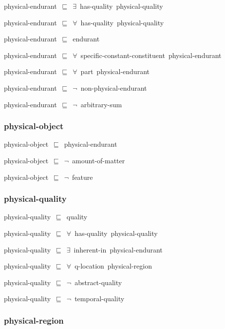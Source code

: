 \documentclass{article}
\begin{document}
physical-endurant~\ensuremath{\sqsubseteq}~\ensuremath{\exists}~has-quality~physical-quality~

physical-endurant~\ensuremath{\sqsubseteq}~\ensuremath{\forall}~has-quality~physical-quality~

physical-endurant~\ensuremath{\sqsubseteq}~endurant~

physical-endurant~\ensuremath{\sqsubseteq}~\ensuremath{\forall}~specific-constant-constituent~physical-endurant~

physical-endurant~\ensuremath{\sqsubseteq}~\ensuremath{\forall}~part~physical-endurant~

physical-endurant~\ensuremath{\sqsubseteq}~\ensuremath{\lnot}~non-physical-endurant

physical-endurant~\ensuremath{\sqsubseteq}~\ensuremath{\lnot}~arbitrary-sum

\subsubsection*{physical-object}

physical-object~\ensuremath{\sqsubseteq}~physical-endurant~

physical-object~\ensuremath{\sqsubseteq}~\ensuremath{\lnot}~amount-of-matter

physical-object~\ensuremath{\sqsubseteq}~\ensuremath{\lnot}~feature

\subsubsection*{physical-quality}

physical-quality~\ensuremath{\sqsubseteq}~quality~

physical-quality~\ensuremath{\sqsubseteq}~\ensuremath{\forall}~has-quality~physical-quality~

physical-quality~\ensuremath{\sqsubseteq}~\ensuremath{\exists}~inherent-in~physical-endurant~

physical-quality~\ensuremath{\sqsubseteq}~\ensuremath{\forall}~q-location~physical-region~

physical-quality~\ensuremath{\sqsubseteq}~\ensuremath{\lnot}~abstract-quality

physical-quality~\ensuremath{\sqsubseteq}~\ensuremath{\lnot}~temporal-quality

\subsubsection*{physical-region}
\end{document}
